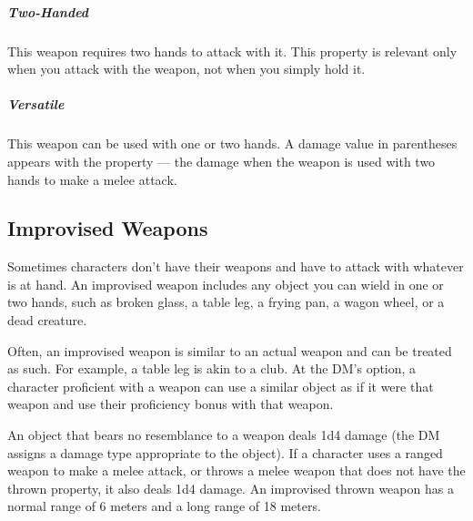     \subparagraph{Two-Handed}
        This weapon requires two hands to attack with it.
        This property is relevant only when you attack with the weapon, not when you simply hold it.
    \subparagraph{Versatile}
        This weapon can be used with one or two hands.
        A damage value in parentheses appears with the property --- the damage when the weapon is used with two hands to make a melee attack.

\subsection*{Improvised Weapons} \label{ssec::improvisedweapons}
    Sometimes characters don't have their weapons and have to attack with whatever is at hand.
    An improvised weapon includes any object you can wield in one or two hands, such as broken glass, a table leg, a frying pan, a wagon wheel, or a dead creature.

    Often, an improvised weapon is similar to an actual weapon and can be treated as such.
    For example, a table leg is akin to a club.
    At the DM's option, a character proficient with a weapon can use a similar object as if it were that weapon and use their proficiency bonus with that weapon.

    An object that bears no resemblance to a weapon deals 1d4 damage (the DM assigns a damage type appropriate to the object).
    If a character uses a ranged weapon to make a melee attack, or throws a melee weapon that does not have the thrown property, it also deals 1d4 damage.
    An improvised thrown weapon has a normal range of 6 meters and a long range of 18 meters.
